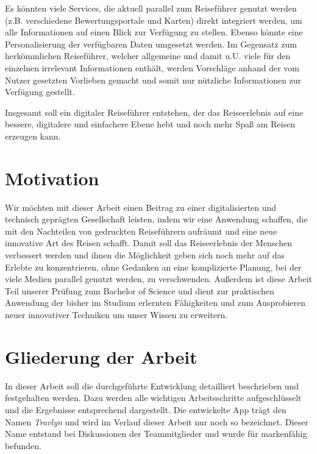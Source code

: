 	\vspace{0.25cm}

	Es könnten viele Services, die aktuell parallel zum Reiseführer genutzt werden (z.B. verschiedene Bewertungsportale und Karten) direkt integriert werden, um alle Informationen auf einen Blick zur Verfügung zu stellen. Ebenso könnte eine Personalisierung der verfügbaren Daten umgesetzt werden. Im Gegensatz zum herkömmlichen Reiseführer, welcher allgemeine und damit u.U. viele für den einzelnen irrelevant Informationen enthält, werden Vorschläge anhand der vom Nutzer gesetzten Vorlieben gemacht und somit nur nützliche Informationen zur Verfügung gestellt.

	\vspace{0.25cm}

	Insgesamt soll ein digitaler Reiseführer entstehen, der das Reiseerlebnis auf eine bessere, digitalere und einfachere Ebene hebt und noch mehr Spaß am Reisen erzeugen kann.

	\section{Motivation}

	Wir möchten mit dieser Arbeit einen Beitrag zu einer digitalisierten und technisch geprägten Gesellschaft leisten, indem wir eine Anwendung schaffen, die mit den Nachteilen von gedruckten Reiseführern aufräumt und eine neue innovative Art des Reisen schafft. Damit soll das Reiseerlebnis der Menschen verbessert werden und ihnen die Möglichkeit geben sich noch mehr auf das Erlebte zu konzentrieren, ohne Gedanken an eine komplizierte Planung, bei der viele Medien parallel genutzt werden, zu verschwenden.
	Außerdem ist diese Arbeit Teil unserer Prüfung zum Bachelor of Science und dient zur praktischen Anwendung der bisher im Studium erlernten Fähigkeiten und zum Ausprobieren neuer innovativer Techniken um unser Wissen zu erweitern.   

	\section{Gliederung der Arbeit}
	
	In dieser Arbeit soll die durchgeführte Entwicklung detailliert beschrieben und festgehalten werden. Dazu werden alle wichtigen Arbeitsschritte aufgeschlüsselt und die Ergebnisse entsprechend dargestellt. Die entwickelte App trägt den Namen \textit{Travlyn} und wird im Verlauf dieser Arbeit nur noch so bezeichnet. Dieser Name entstand bei Diskussionen der Teammitglieder und wurde für markenfähig befunden. 
	
